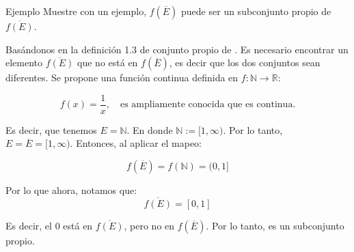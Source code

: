 \newpage 
\begin{noter}{Ejemplo}
Muestre con un ejemplo, $f(\overline{E})$ puede ser un subconjunto propio de $\overline{f(E)}$.

\begin{solution}
Basándonos en la definición 1.3 de conjunto propio de \cite{rudin1976principles}. Es necesario encontrar un elemento $\overline{f(E)}$ que no está en $f(\overline{E})$, es decir que los dos conjuntos sean diferentes. Se propone una función continua definida en $f:\mathbb{N}\to \mathbb{R}$: 

$$f(x)=\frac{1}{x}, \quad \text{es ampliamente conocida que es continua.}$$

Es decir, que tenemos $E=\mathbb{N}$. En donde $\mathbb{N}:= [1,\infty)$. Por lo tanto, $E= \overline{E}= [1,\infty)$. Entonces, al aplicar el mapeo: 

$$f(\overline{E})=f(\mathbb{N})=(0,1] $$

Por lo que ahora, notamos que: 
$$\overline{f(E)}=[0,1]$$

Es decir, el $0$ está en $\overline{f(E)}$, pero no en $f(\overline{E})$. Por lo tanto, es un subconjunto propio. 
\end{solution}
\end{noter}